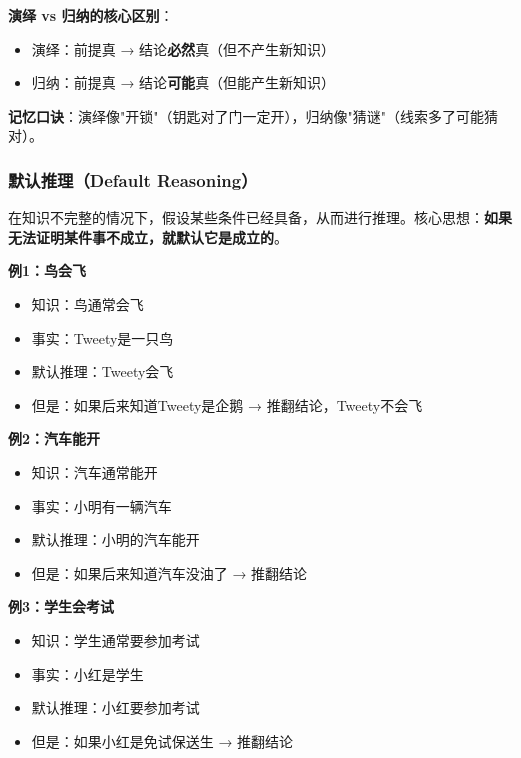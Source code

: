 \begin{notebox}
\textbf{演绎 vs 归纳的核心区别}：
\begin{itemize}[itemsep=0pt]
    \item 演绎：前提真 → 结论\textbf{必然}真（但不产生新知识）
    \item 归纳：前提真 → 结论\textbf{可能}真（但能产生新知识）
\end{itemize}

\textbf{记忆口诀}：演绎像"开锁"（钥匙对了门一定开），归纳像"猜谜"（线索多了可能猜对）。
\end{notebox}

\subsubsection{默认推理（Default Reasoning）}
\begin{conceptbox}
在知识不完整的情况下，假设某些条件已经具备，从而进行推理。核心思想：\textbf{如果无法证明某件事不成立，就默认它是成立的}。
\end{conceptbox}

\begin{examplebox}[例子：默认推理的生活应用]
\textbf{例1：鸟会飞}
\begin{itemize}[itemsep=0pt]
    \item 知识：鸟通常会飞
    \item 事实：Tweety是一只鸟
    \item 默认推理：Tweety会飞
    \item 但是：如果后来知道Tweety是企鹅 → 推翻结论，Tweety不会飞
\end{itemize}

\textbf{例2：汽车能开}
\begin{itemize}[itemsep=0pt]
    \item 知识：汽车通常能开
    \item 事实：小明有一辆汽车
    \item 默认推理：小明的汽车能开
    \item 但是：如果后来知道汽车没油了 → 推翻结论
\end{itemize}

\textbf{例3：学生会考试}
\begin{itemize}[itemsep=0pt]
    \item 知识：学生通常要参加考试
    \item 事实：小红是学生
    \item 默认推理：小红要参加考试
    \item 但是：如果小红是免试保送生 → 推翻结论
\end{itemize}
\end{examplebox}

